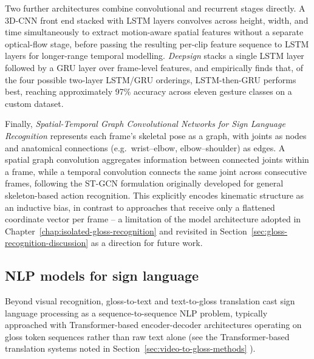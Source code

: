 Two further architectures combine convolutional and recurrent stages directly.
A 3D-CNN front end stacked with LSTM layers \cite{cnn3dlstm2023realtime}
convolves across height, width, and time simultaneously to extract motion-aware
spatial features without a separate optical-flow stage, before passing the
resulting per-clip feature sequence to LSTM layers for longer-range temporal
modelling. \emph{Deepsign} \cite{deepsign2022} stacks a single LSTM layer
followed by a GRU layer over frame-level features, and empirically finds that,
of the four possible two-layer LSTM/GRU orderings, LSTM-then-GRU performs best,
reaching approximately 97\% accuracy across eleven gesture classes on a custom
dataset.

Finally, \emph{Spatial-Temporal Graph Convolutional Networks for Sign Language
Recognition} \cite{correia2019stgcn} represents each frame's skeletal pose as a
graph, with joints as nodes and anatomical connections (e.g.\ wrist--elbow,
elbow--shoulder) as edges. A spatial graph convolution aggregates information
between connected joints within a frame, while a temporal convolution connects
the same joint across consecutive frames, following the ST-GCN formulation
originally developed for general skeleton-based action recognition. This
explicitly encodes kinematic structure as an inductive bias, in contrast to
approaches that receive only a flattened coordinate vector per frame -- a
limitation of the model architecture adopted in
Chapter~\ref{chap:isolated-gloss-recognition} and revisited in
Section~\ref{sec:gloss-recognition-discussion} as a direction for future work.

\subsection{NLP models for sign language}
\label{sec:nlp-models-sign-language}

Beyond visual recognition, gloss-to-text and text-to-gloss translation cast sign
language processing as a sequence-to-sequence NLP problem, typically approached
with Transformer-based encoder-decoder architectures operating on gloss token
sequences rather than raw text alone (see the Transformer-based translation
systems noted in Section~\ref{sec:video-to-gloss-methods}
\cite{review2024dlprocessing}).


